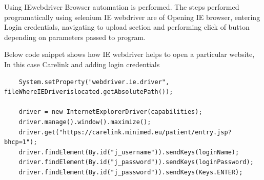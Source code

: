\documentclass[article,type=msc,colorback,accentcolor=tud9c,twoside,11pt]{tudthesis}
\begin{document}
	Using IEwebdriver Browser automation is performed. The steps performed programatically using selenium IE webdriver are of Opening IE browser, entering Login credentials, navigating to upload section and performing click of button depending on parameters passed to program.

	Below code snippet shows how IE webdriver helps to open a particular website, In this case Carelink and adding login credentials
	\begin{lstlisting}
	System.setProperty("webdriver.ie.driver", fileWhereIEDriverislocated.getAbsolutePath());
	
	driver = new InternetExplorerDriver(capabilities);	
	driver.manage().window().maximize();
	driver.get("https://carelink.minimed.eu/patient/entry.jsp?bhcp=1");
	driver.findElement(By.id("j_username")).sendKeys(loginName);
	driver.findElement(By.id("j_password")).sendKeys(loginPassword);
	driver.findElement(By.id("j_password")).sendKeys(Keys.ENTER);
	\end{lstlisting}
\end{document}
